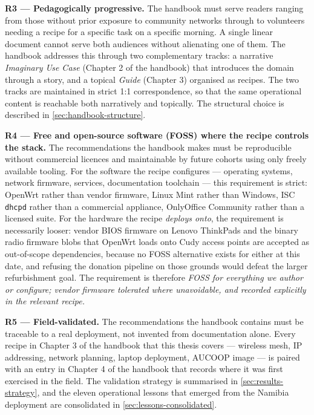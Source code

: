 \textbf{R3 --- Pedagogically progressive.} The handbook must serve
readers ranging from those without prior exposure to community networks
through to volunteers needing a recipe for a specific task on a specific
morning. A single linear document cannot serve both audiences without
alienating one of them. The handbook addresses this through two
complementary tracks: a narrative \emph{Imaginary Use Case} (Chapter 2
of the handbook) that introduces the domain through a story, and a
topical \emph{Guide} (Chapter 3) organised as recipes. The two tracks
are maintained in strict 1:1 correspondence, so that the same
operational content is reachable both narratively and topically. The
structural choice is described in \autoref{sec:handbook-structure}.

\textbf{R4 --- Free and open-source software (FOSS) where the recipe
controls the stack.} The recommendations the handbook makes must be
reproducible without commercial licences and maintainable by future
cohorts using only freely available tooling. For the software the recipe
configures --- operating systems, network firmware, services,
documentation toolchain --- this requirement is strict: OpenWrt rather
than vendor firmware, Linux Mint rather than Windows, ISC \texttt{dhcpd}
rather than a commercial appliance, OnlyOffice Community rather than a
licensed suite. For the hardware the recipe \emph{deploys onto}, the
requirement is necessarily looser: vendor BIOS firmware on Lenovo
ThinkPads and the binary radio firmware blobs that OpenWrt loads onto
Cudy access points are accepted as out-of-scope dependencies, because no
FOSS alternative exists for either at this date, and refusing the
donation pipeline on those grounds would defeat the larger refurbishment
goal. The requirement is therefore \emph{FOSS for everything we author
or configure; vendor firmware tolerated where unavoidable, and recorded
explicitly in the relevant recipe.}

\textbf{R5 --- Field-validated.} The recommendations the handbook
contains must be traceable to a real deployment, not invented from
documentation alone. Every recipe in Chapter 3 of the handbook that this
thesis covers --- wireless mesh, IP addressing, network planning, laptop
deployment, AUCOOP image --- is paired with an entry in Chapter 4 of the
handbook that records where it was first exercised in the field. The
validation strategy is summarised in \autoref{sec:results-strategy}, and
the eleven operational lessons that emerged from the Namibia deployment
are consolidated in \autoref{sec:lessons-consolidated}.

